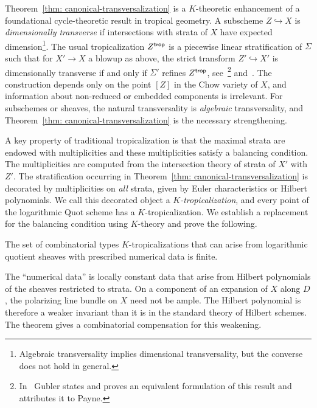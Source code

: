 \documentclass[11pt]{amsart}
\theoremstyle{definition}
\newenvironment{customthm}[1]
{\renewcommand\theinnercustomthm{#1}\innercustomthm}
{\endinnercustomthm}
\theoremstyle{definition}
\begin{document}
Theorem~\ref{thm: canonical-transversalization} is a $K$-theoretic enhancement of a foundational cycle-theoretic result in tropical geometry. A subscheme $Z\hookrightarrow X$ is {\it dimensionally transverse} if intersections with strata of $X$ have expected dimension\footnote{Algebraic transversality implies dimensional transversality, but the converse does not hold in general.}. The usual tropicalization $Z^{\sf trop}$ is a piecewise linear stratification of $\Sigma$ such that for $X'\to X$ a blowup as above, the strict transform $Z'\hookrightarrow X'$ is dimensionally transverse if and only if $\Sigma'$ refines $Z^{\sf trop}$, see~\cite[Section~14]{Gub:guideToTrop}\footnote{In~\cite{Gub:guideToTrop} Gubler states and proves an equivalent formulation of this result and attributes it to Payne.} and~\cite{ulirsch2014tropical}. The construction depends only on the point $[Z]$ in the Chow variety of $X$, and information about non-reduced or embedded components is irrelevant. For subschemes or sheaves, the natural transversality is {\it algebraic} transversality, and Theorem~\ref{thm: canonical-transversalization} is the necessary strengthening.

A key property of traditional tropicalization is that the maximal strata are endowed with multiplicities and these multiplicities satisfy a balancing condition. The multiplicities are computed from the intersection theory of strata of $X'$ with $Z'$.  The stratification occurring in Theorem~\ref{thm: canonical-transversalization} is decorated by multiplicities on {\it all} strata, given by Euler characteristics or Hilbert polynomials. We call this decorated object a {\it $K$-tropicalization}, and every point of the logarithmic Quot scheme has a $K$-tropicalization. We establish a replacement for the balancing condition using $K$-theory and prove the following. 

\begin{customthm}{C}[$K$-tropicalizations are bounded]\label{thm: tropical-finiteness}
The set of combinatorial types $K$-tropicalizations that can arise from logarithmic quotient sheaves with prescribed numerical data is finite. 
\end{customthm}

The ``numerical data'' is locally constant data that arise from Hilbert polynomials of the sheaves restricted to strata. On a component of an expansion of $X$ along $D$, the polarizing line bundle on $X$ need not be ample. The Hilbert polynomial is therefore a weaker invariant than it is in the standard theory of Hilbert schemes. The theorem gives a combinatorial compensation for this weakening. 
\end{document}
